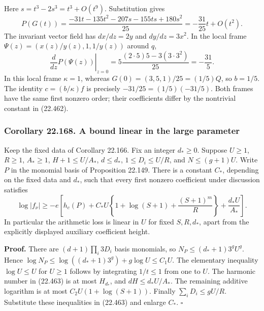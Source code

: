 \documentclass[
  11pt,
  a4paper,
]{article}
\begin{document}
Here \(s=t^3-2s^3=t^3+O(t^9)\). Substitution gives \[
 P(G(t))=
 \frac{-31t-135t^2-207s-155ts+180s^2}{25}
             =-\frac{31}{25}t+O(t^2).
 \tag{22.467}
\] The invariant vector field has \(dx/dz=2y\) and \(dy/dz=3x^2\). In
the local frame \(\Psi(z)=(x(z)/y(z),1,1/y(z))\) around \(q\), \[
 \left.\frac d{dz}P(\Psi(z))\right|_{z=0}
 =5\frac{(2\cdot5)5-3(3\cdot3^2)}{25}
 =-\frac{31}{5}.
 \tag{22.468}
\] In this local frame \(\kappa=1\), whereas \(G(0)=(3,5,1)/25=(1/5)Q\),
so \(b=1/5\). The identity \(c=(b/\kappa)f\) is precisely
\(-31/25=(1/5)(-31/5)\). Both frames have the same first nonzero order;
their coefficients differ by the nontrivial constant in (22.462).

\subsubsection{Corollary 22.168. A bound linear in the large
parameter}\label{corollary-22.168.-a-bound-linear-in-the-large-parameter}

Keep the fixed data of Corollary 22.166. Fix an integer \(d_*\ge0\).
Suppose \(U\ge1\), \(R\ge1\), \(A_*\ge1\), \(H+1\le U/A_*\),
\(d\le d_*\), \(1\le D_i\le U/R\), and \(N\le(g+1)U\). Write \(P\) in
the monomial basis of Proposition 22.149. There is a constant \(C_*\),
depending on the fixed data and \(d_*\), such that every first nonzero
coefficient under discussion satisfies \[
 \log|f_\nu|\ge
 -e\left[h_c(P)+C_*U\left\{1+\log(S+1)
                         +\frac{(S+1)^m}{R}\right\}
                         +\frac{d_*U}{A_*}\right].
 \tag{22.469}
\] In particular the arithmetic loss is linear in \(U\) for fixed
\(S,R,d_*\), apart from the explicitly displayed auxiliary coefficient
height.

\textbf{Proof.} There are \((d+1)\prod_i3D_i\) basis monomials, so
\(N_P\le(d_*+1)3^gU^g\). Hence
\(\log N_P\le\log((d_*+1)3^g)+g\log U\le C_1U\). The elementary
inequality \(\log U\le U\) for \(U\ge1\) follows by integrating
\(1/t\le1\) from one to \(U\). The harmonic number in (22.463) is at
most \(H_{d_*}\), and \(dH\le d_*U/A_*\). The remaining additive
logarithm is at most \(C_2U(1+\log(S+1))\). Finally
\(\sum_iD_i\le gU/R\). Substitute these inequalities in (22.463) and
enlarge \(C_*\). \(\square\)
\end{document}
